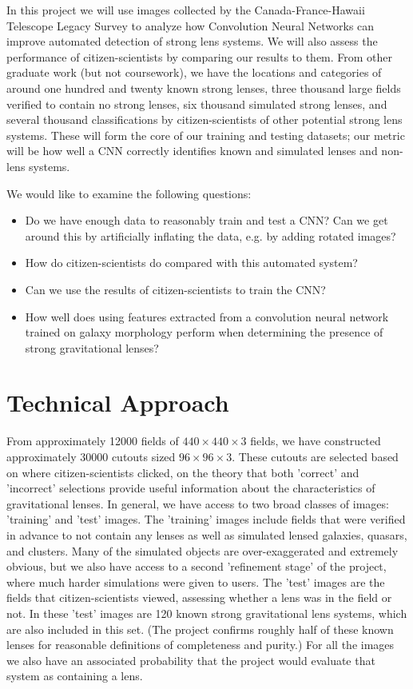 \documentclass[10pt,twocolumn,letterpaper]{article}
\begin{document}
In this project we will use images collected by the Canada-France-Hawaii
Telescope Legacy Survey to analyze how Convolution Neural Networks can improve
automated detection of strong lens systems. We will also assess the performance
of citizen-scientists by comparing our results to them. From other graduate
work (but not coursework), we have the locations and categories of around one
hundred and twenty known strong lenses, three thousand large fields verified to
contain no strong lenses, six thousand simulated strong lenses, and several
thousand classifications by citizen-scientists of other potential strong lens
systems.  These will form the core of our training and testing datasets; our
metric will be how well a CNN correctly identifies known and simulated lenses
and non-lens systems.

We would like to examine the following questions:
\begin{itemize}
\item{ Do we have enough data to reasonably train and test a CNN? Can we get
       around this by artificially inflating the data, e.g. by adding rotated
     images?}
\item{ How do citizen-scientists do compared with this automated system?}
\item{ Can we use the results of citizen-scientists to train the CNN?}
\item{ How well does using features extracted from a convolution neural network
       trained on galaxy morphology perform when determining the presence of
     strong gravitational lenses?}
\end{itemize}


\section{Technical Approach}

From approximately 12000 fields of $440\times440\times3$ fields, we have
constructed approximately 30000 cutouts sized $96\times96\times3$. These cutouts
are selected based on where citizen-scientists clicked, on the theory that both
'correct' and 'incorrect' selections provide useful information about the
characteristics of gravitational lenses. In general, we have access to two
broad classes of images: 'training' and 'test' images. The 'training' images
include fields that were verified in advance to not contain any lenses as well
as simulated lensed galaxies, quasars, and clusters. Many of the simulated
objects are over-exaggerated and extremely obvious, but we also have access to
a second 'refinement stage' of the project, where much harder simulations were
given to users. The 'test' images are the fields that citizen-scientists
viewed, assessing whether a lens was in the field or not. In these 'test'
images are 120 known strong gravitational lens systems, which are also included
in this set. (The project confirms roughly half of these known lenses for
reasonable definitions of completeness and purity.) For all the images we also
have an associated probability that the project would evaluate that system as
containing a lens.
\end{document}

